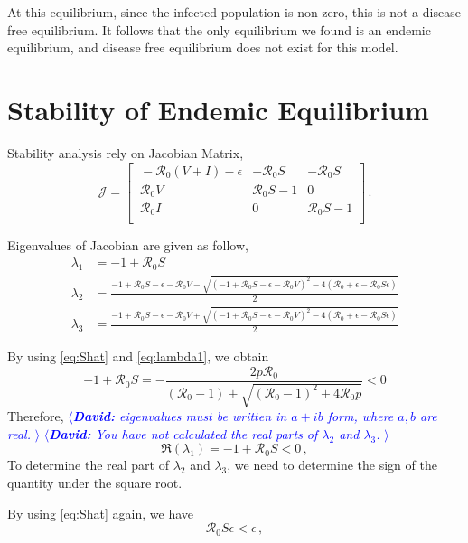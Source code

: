 \documentclass[12pt]{article}
\newcommand{\R}{\mathcal{R}}
\newcommand{\david}[1]{\textcolor{blue}{$\langle${\slshape{\bfseries David:} #1 }$\rangle$}}
\begin{document}
At this equilibrium, since the infected population is non-zero, this is not a disease free equilibrium. It follows that the only equilibrium we found is an endemic equilibrium, and disease free equilibrium does not exist for this model.

\section{Stability of Endemic Equilibrium}

Stability analysis rely on Jacobian Matrix,
\begin{equation}
\mathcal{J} =
\begin{bmatrix}
    \ -\R_0 (V+I)-\epsilon       & -\R_0 S     &-\R_0 S\\
    \ \R_0 V       & \R_0 S-1    &0\\
    \ \R_0 I       &0     &\R_0 S-1\\
\end{bmatrix}\,.
\end{equation}

Eigenvalues of Jacobian are given as follow,
\begin{subequations}
\begin{align}
\lambda_1&=-1+\R_0 S \label{eq:lambda1}\\
\lambda_2&=\frac{-1+\R_0 S-\epsilon-\R_0 V-\sqrt{(-1+\R_0 S-\epsilon-\R_0 V)^2-4(\R_0+\epsilon-\R_0 S\epsilon)}}{2} \label{eq:lambda2}\\
\lambda_3&=\frac{-1+\R_0 S-\epsilon-\R_0 V+\sqrt{(-1+\R_0 S-\epsilon-\R_0 V)^2-4(\R_0+\epsilon-\R_0 S\epsilon)}}{2}\label{eq:lambda3}
\end{align}
\end{subequations}

By using \autoref{eq:Shat} and \autoref{eq:lambda1}, we obtain
\begin{equation}
-1+\R_0 S = - \frac{2p\R_0}{(\R_0 -1)+ \sqrt{(\R_0-1)^2+4\R_0 p}}<0
\end{equation}
Therefore, \david{eigenvalues must be written in $a+ib$ form, where
  $a,b$ are real.}
\david{You have not calculated the real parts of $\lambda_2$ and $\lambda_3$.}
\begin{equation}
\Re(\lambda_1) =-1+\R_0 S<0\,,
\end{equation}
To determine the real part of $\lambda_2$ and $\lambda_3$, we need to determine the sign of the quantity under the square root. 

By using \autoref{eq:Shat} again, we have
\begin{equation}
\R_0 S\epsilon<\epsilon\,,
\end{equation}
\end{document}
